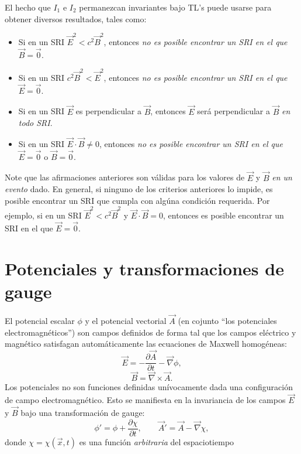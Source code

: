 El hecho que $I_1$ e $I_2$ permanezcan invariantes bajo TL's puede usarse para
obtener diversos resultados, tales como:
\begin{itemize}
\item Si en un SRI $\vec{E}^2<c^2\vec{B}^2$, entonces \textit{no es posible
encontrar un SRI en el que} $\vec{B}=\vec{0}$.
\item Si en un SRI $c^2\vec{B}^2<\vec{E}^2$, entonces \textit{no es posible
encontrar un SRI en el que} $\vec{E}=\vec{0}$.
\item Si en un SRI $\vec{E}$ es perpendicular a $\vec{B}$, entonces $\vec{E}$
será perpendicular a $\vec{B}$ \textit{en todo SRI}.
\item Si en un SRI $\vec{E}\cdot\vec{B}\neq 0$, entonces \textit{no es posible encontrar un SRI en el que} $\vec{E}=\vec{0}$ o $\vec{B}=\vec{0}$.
\end{itemize}
Note que las afirmaciones anteriores son válidas para los valores de $\vec{E}$
y $\vec{B}$ \textit{en un evento} dado. En general, si ninguno de los criterios anteriores lo impide, es posible encontrar un SRI que cumpla con algúna condición requerida. Por ejemplo, si en un SRI $\vec{E}^2<c^2\vec{B}^2$ y $\vec{E}\cdot\vec{B}=0$, entonces es posible encontrar un SRI en el que $\vec{E}=\vec{0}$.


\section{Potenciales y transformaciones de gauge}

El potencial escalar $\phi$ y el potencial vectorial $\vec{A}$ (en cojunto ``los potenciales electromagnéticos'') son campos definidos de forma tal que los campos eléctrico y magnético satisfagan automáticamente las ecuaciones de Maxwell homogéneas: 
\begin{equation}\label{defphi}
\vec{E} =  - \frac{\partial \vec{A}}{\partial t} - \vec{\nabla}\phi ,
\end{equation}
\begin{equation}\label{BrotA}
\vec{B}=\vec{\nabla}\times \vec{A}.
\end{equation}
Los potenciales no son funciones definidas unívocamente dada una configuración de campo electromagnético. Esto se manifiesta en la invariancia de los campos $\vec{E}$ y $\vec{B}$ bajo una transformación de gauge:
\begin{equation}
\phi' =\phi +\frac{\partial \chi}{\partial t}, \qquad
{\vec{A}}' = \vec{A} - \vec{\nabla}{\chi},
\end{equation}
donde $\chi=\chi(\vec{x},t)$ es una función \textit{arbitraria} del espaciotiempo

